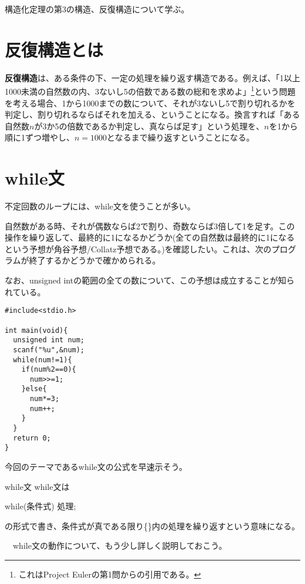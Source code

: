 構造化定理の第3の構造、反復構造について学ぶ。
\section{反復構造とは}
\textbf{反復構造}は、ある条件の下、一定の処理を繰り返す構造である。例えば、「1以上1000未満の自然数の内、3ないし5の倍数である数の総和を求めよ」\footnote{これはProject Eulerの第1問からの引用である。}という問題を考える場合、1から1000までの数について、それが3ないし5で割り切れるかを判定し、割り切れるならばそれを加える、ということになる。換言すれば「ある自然数$n$が3か5の倍数であるか判定し、真ならば足す」という処理を、$n$を1から順に1ずつ増やし、$n=1000$となるまで繰り返すということになる。

\section{while文}
不定回数のループには、while文を使うことが多い。
\begin{boxnote}
\begin{multicols}{2}
自然数がある時、それが偶数ならば2で割り、奇数ならば3倍して1を足す。この操作を繰り返して、最終的に1になるかどうか(全ての自然数は最終的に1になるという予想が角谷予想/Collatz予想である。)を確認したい。これは、次のプログラムが終了するかどうかで確かめられる。

なお、unsigned intの範囲の全ての数について、この予想は成立することが知られている。
\begin{lstlisting}[caption=角谷予想,label=program5_1]
#include<stdio.h>

int main(void){
  unsigned int num;
  scanf("%u",&num);
  while(num!=1){
    if(num%2==0){
      num>>=1;
    }else{
      num*=3;
      num++;
    }
  }
  return 0;
}
\end{lstlisting}
\end{multicols}
\end{boxnote}
今回のテーマであるwhile文の公式を早速示そう。
\begin{itembox}[l]{while文}
while文は
\begin{code}
while(条件式){
  処理;
}
\end{code}
の形式で書き、条件式が真である限り\{\}内の処理を繰り返すという意味になる。
\end{itembox}
　while文の動作について、もう少し詳しく説明しておこう。

